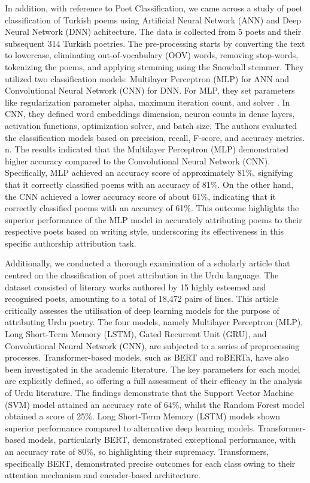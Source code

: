 \documentclass[conference]{IEEEtran}
\begin{document}
\par
In addition, with reference to Poet Classification, we came across a study \cite{b6}of poet classification of Turkish poems using Artificial Neural Network (ANN) and Deep Neural Network (DNN) achitecture. The data is collected from 5 poets and their subsequent 314 Turkish poetries. The pre-processing starts by converting the text to lowercase, eliminating out-of-vocabulary (OOV) words, removing stop-words, tokenizing the poems, and applying stemming using the Snowball stemmer. They utilized two classification models: Multilayer Perceptron (MLP) for ANN and Convolutional Neural Network (CNN) for DNN. For MLP, they set parameters like regularization parameter alpha, maximum iteration count, and solver \cite{b6}. In CNN, they defined word embeddings dimension, neuron counts in dense layers, activation functions, optimization solver, and batch size. The authors evaluated the classification models based on precision, recall, F-score, and accuracy metrics. n. The results indicated that the Multilayer Perceptron (MLP) demonstrated higher accuracy compared to the Convolutional Neural Network (CNN). Specifically, MLP achieved an accuracy score of approximately 81\%, signifying that it correctly classified poems with an accuracy of 81\%. On the other hand, the CNN achieved a lower accuracy score of about 61\%, indicating that it correctly classified poems with an accuracy of 61\%. This outcome highlights the superior performance of the MLP model in accurately attributing poems to their respective poets based on writing style, underscoring its effectiveness in this specific authorship attribution task.


\par
Additionally, we conducted a thorough examination of a scholarly article \cite{b4} that centred on the classification of poet attribution in the Urdu language. The dataset consisted of literary works authored by 15 highly esteemed and recognised poets, amounting to a total of 18,472 pairs of lines. This article critically assesses the utilisation of deep learning models for the purpose of attributing Urdu poetry. The four models, namely Multilayer Perceptron (MLP), Long Short-Term Memory (LSTM), Gated Recurrent Unit (GRU), and Convolutional Neural Network (CNN), are subjected to a series of preprocessing processes. Transformer-based models, such as BERT and roBERTa, have also been investigated in the academic literature. The key parameters for each model are explicitly defined, so offering a full assessment of their efficacy in the analysis of Urdu literature. The findings demonstrate that the Support Vector Machine (SVM) model attained an accuracy rate of 64\%, whilst the Random Forest model obtained a score of 25\%. Long Short-Term Memory (LSTM) models shown superior performance compared to alternative deep learning models. Transformer-based models, particularly BERT, demonstrated exceptional performance, with an accuracy rate of 80\%, so highlighting their supremacy. Transformers, specifically BERT, demonstrated precise outcomes for each class owing to their attention mechanism and encoder-based architecture.
\end{document}
